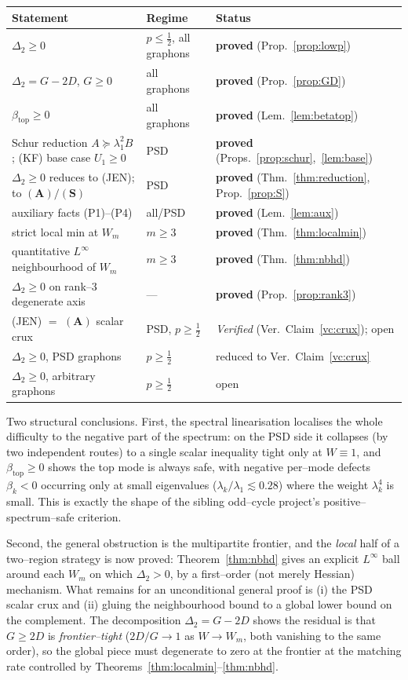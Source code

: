 \documentclass[11pt]{article}
\theoremstyle{definition}
\newcommand{\Wm}{W_m}
\begin{document}
\begin{center}
\begin{tabular}{lll}
\toprule
Statement & Regime & Status\\
\midrule
$\Delta_2\ge0$ & $p\le\tfrac12$, all graphons & \textbf{proved} (Prop.~\ref{prop:lowp})\\
$\Delta_2=G-2D$, $G\ge0$ & all graphons & \textbf{proved} (Prop.~\ref{prop:GD})\\
$\beta_{\mathrm{top}}\ge0$ & all graphons & \textbf{proved} (Lem.~\ref{lem:betatop})\\
Schur reduction $A\succeq\lambda_1^2B$; (KF) base case $U_1\ge0$ & PSD & \textbf{proved} (Props.~\ref{prop:schur},~\ref{lem:base})\\
$\Delta_2\ge0$ reduces to (JEN); to $(\mathbf A)/(\mathbf S)$ & PSD & \textbf{proved} (Thm.~\ref{thm:reduction}, Prop.~\ref{prop:S})\\
auxiliary facts (P1)--(P4) & all/PSD & \textbf{proved} (Lem.~\ref{lem:aux})\\
strict local min at $\Wm$ & $m\ge3$ & \textbf{proved} (Thm.~\ref{thm:localmin})\\
quantitative $L^\infty$ neighbourhood of $\Wm$ & $m\ge3$ & \textbf{proved} (Thm.~\ref{thm:nbhd})\\
$\Delta_2\ge0$ on rank--3 degenerate axis & --- & \textbf{proved} (Prop.~\ref{prop:rank3})\\
(JEN) $=$ $(\mathbf A)$ scalar crux & PSD, $p\ge\tfrac12$ & \emph{Verified} (Ver.\ Claim~\ref{vc:crux}); open\\
$\Delta_2\ge0$, PSD graphons & $p\ge\tfrac12$ & reduced to Ver.\ Claim~\ref{vc:crux}\\
$\Delta_2\ge0$, arbitrary graphons & $p\ge\tfrac12$ & open\\
\bottomrule
\end{tabular}
\end{center}

Two structural conclusions.  First, the spectral linearisation localises the
whole difficulty to the negative part of the spectrum: on the PSD side it
collapses (by two independent routes) to a single scalar inequality tight only at
$W\equiv1$, and $\beta_{\mathrm{top}}\ge0$ shows the top mode is always safe, with
negative per--mode defects $\beta_k<0$ occurring only at small eigenvalues
($\lambda_k/\lambda_1\lesssim0.28$) where the weight $\lambda_k^4$ is small.  This
is exactly the shape of the sibling odd--cycle project's positive--spectrum--safe
criterion.

Second, the general obstruction is the multipartite frontier, and the \emph{local}
half of a two--region strategy is now proved: Theorem~\ref{thm:nbhd} gives an
explicit $L^\infty$ ball around each $\Wm$ on which $\Delta_2>0$, by a first--order
(not merely Hessian) mechanism.  What remains for an unconditional general proof is
(i) the PSD scalar crux and (ii) gluing the neighbourhood bound to a global lower
bound on the complement.  The decomposition $\Delta_2=G-2D$ shows the residual is
that $G\ge2D$ is \emph{frontier--tight} ($2D/G\to1$ as $W\to\Wm$, both vanishing to
the same order), so the global piece must degenerate to zero at the frontier at
the matching rate controlled by Theorems~\ref{thm:localmin}--\ref{thm:nbhd}.
\end{document}
